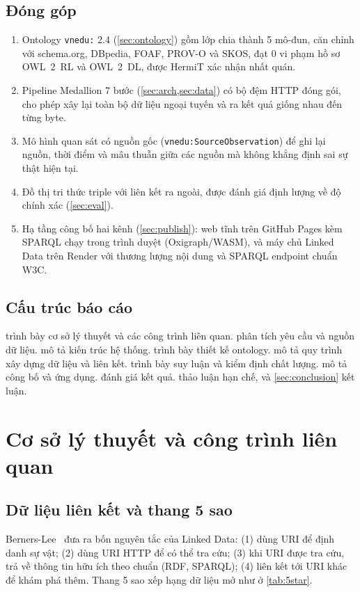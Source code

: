 \documentclass[12pt,a4paper]{article}
\newcommand{\vn}[1]{\texttt{vnedu:\allowbreak #1}}
\begin{document}
\subsection{Đóng góp}
\begin{enumerate}
  \item Ontology \texttt{vnedu:} 2.4 (\cref{sec:ontology}) gồm \metricClasses{} lớp chia thành 5 mô-đun, căn chỉnh với
  schema.org, DBpedia, FOAF, PROV-O và SKOS, đạt 0 vi phạm hồ sơ OWL~2~RL và OWL~2~DL, được HermiT xác nhận nhất quán.
  \item Pipeline Medallion 7 bước (\cref{sec:arch,sec:data}) có bộ đệm HTTP đóng gói, cho phép xây lại toàn bộ dữ liệu
  ngoại tuyến và ra kết quả giống nhau đến từng byte.
  \item Mô hình quan sát có nguồn gốc (\vn{SourceObservation}) để ghi lại nguồn, thời điểm và mâu thuẫn giữa các nguồn
  mà không khẳng định sai sự thật hiện tại.
  \item Đồ thị tri thức \metricUnionTriples{} triple với \metricLinkTriples{} liên kết ra ngoài, được đánh giá định
  lượng về độ chính xác (\cref{sec:eval}).
  \item Hạ tầng công bố hai kênh (\cref{sec:publish}): web tĩnh trên GitHub Pages kèm SPARQL chạy trong trình duyệt
  (Oxigraph/WASM), và máy chủ Linked Data trên Render với thương lượng nội dung và SPARQL endpoint chuẩn W3C.
\end{enumerate}

\subsection{Cấu trúc báo cáo}
 trình bày cơ sở lý thuyết và các công trình liên quan.  phân tích yêu cầu và nguồn
dữ liệu.  mô tả kiến trúc hệ thống.  trình bày thiết kế ontology.  mô
tả quy trình xây dựng dữ liệu và liên kết.  trình bày suy luận và kiểm định chất lượng. 
mô tả công bố và ứng dụng.  đánh giá kết quả.  thảo luận hạn chế, và
\cref{sec:conclusion} kết luận.

\section{Cơ sở lý thuyết và công trình liên quan}\label{sec:background}

\subsection{Dữ liệu liên kết và thang 5 sao}
Berners-Lee~\cite{bernerslee2006linked} đưa ra bốn nguyên tắc của Linked Data: (1) dùng URI để định danh sự vật;
(2) dùng URI HTTP để có thể tra cứu; (3) khi URI được tra cứu, trả về thông tin hữu ích theo chuẩn (RDF, SPARQL);
(4) liên kết tới URI khác để khám phá thêm. Thang 5 sao xếp hạng dữ liệu mở như ở \cref{tab:5star}.
\end{document}
